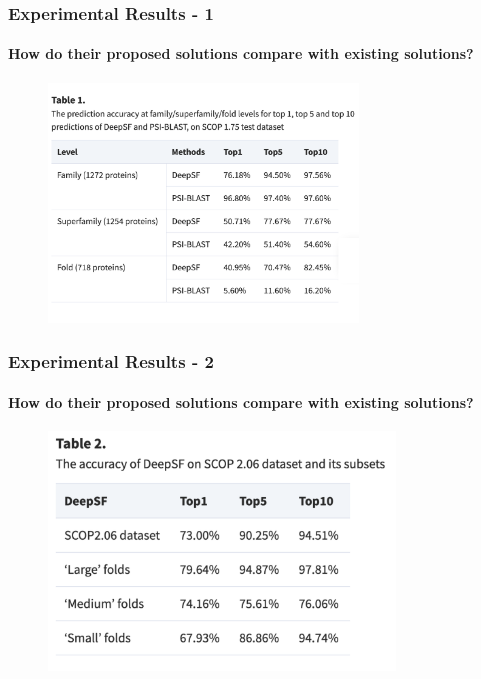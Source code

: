\documentclass[xcolor={usenames,dvipsnames},hyperref={hyperindex,bookmarks}]{beamer}
\begin{document}
\frame
{
	\frametitle{Experimental Results - 1}
	\framesubtitle{How do their proposed solutions compare with existing solutions?}


	\begin{figure}[h]
	\centering 
	\includegraphics[height=2.5in]{./pics/table-1}
	\label{fig:Table1}
	\end{figure}
}




\frame
{
	\frametitle{Experimental Results - 2}
	\framesubtitle{How do their proposed solutions compare with existing solutions?}


	\begin{figure}[h]
	\centering 
	\includegraphics[height=2.5in]{./pics/table-2}
	\label{fig:Table2}
	\end{figure}
}
\end{document}
